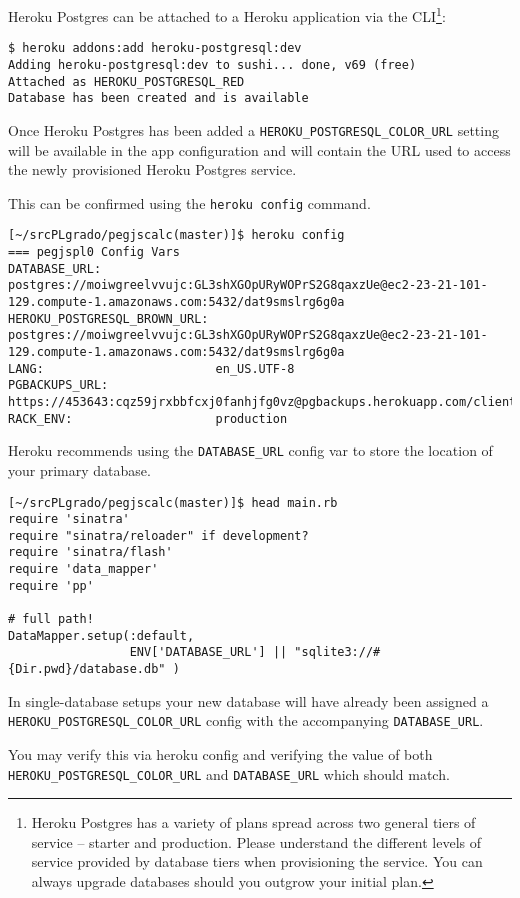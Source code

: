 Heroku Postgres can be attached to a Heroku application via the 
CLI\footnote{Heroku Postgres has a variety of plans spread across two
general tiers of service – starter and production. Please understand the
different levels of service provided by database tiers when provisioning
the service. You can always upgrade databases should you outgrow your
initial plan.}:
\begin{verbatim}
$ heroku addons:add heroku-postgresql:dev
Adding heroku-postgresql:dev to sushi... done, v69 (free)
Attached as HEROKU_POSTGRESQL_RED
Database has been created and is available
\end{verbatim}

Once Heroku Postgres has been added a \verb|HEROKU_POSTGRESQL_COLOR_URL| 
setting
will be available in the app configuration and will contain the URL
used to access the newly provisioned Heroku Postgres service. 

This can
be confirmed using the \verb|heroku config| command.
\begin{verbatim}
[~/srcPLgrado/pegjscalc(master)]$ heroku config
=== pegjspl0 Config Vars
DATABASE_URL:                postgres://moiwgreelvvujc:GL3shXGOpURyWOPrS2G8qaxzUe@ec2-23-21-101-129.compute-1.amazonaws.com:5432/dat9smslrg6g0a
HEROKU_POSTGRESQL_BROWN_URL: postgres://moiwgreelvvujc:GL3shXGOpURyWOPrS2G8qaxzUe@ec2-23-21-101-129.compute-1.amazonaws.com:5432/dat9smslrg6g0a
LANG:                        en_US.UTF-8
PGBACKUPS_URL:               https://453643:cqz59jrxbbfcxj0fanhjfg0vz@pgbackups.herokuapp.com/client
RACK_ENV:                    production
\end{verbatim}


Heroku recommends using the \verb|DATABASE_URL| config var to store
the location
of your primary database. 
\begin{verbatim}
[~/srcPLgrado/pegjscalc(master)]$ head main.rb 
require 'sinatra'
require "sinatra/reloader" if development?
require 'sinatra/flash'
require 'data_mapper'
require 'pp'

# full path!
DataMapper.setup(:default, 
                 ENV['DATABASE_URL'] || "sqlite3://#{Dir.pwd}/database.db" )
\end{verbatim}

In single-database setups your new database
will have already been assigned a \verb|HEROKU_POSTGRESQL_COLOR_URL|
config with
the accompanying \verb|DATABASE_URL|. 

You may verify this via heroku config and
verifying the value of both \verb|HEROKU_POSTGRESQL_COLOR_URL| 
and \verb|DATABASE_URL|
which should match.

